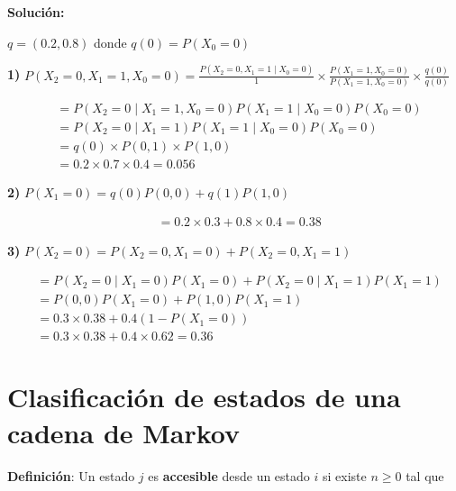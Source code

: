 \documentclass[12pt,a4paper]{article}
\begin{document}
\textbf{Solución:}

$q = (0.2, 0.8)$ donde $q(0) = P(X_0 = 0)$

\begin{center}
\end{center}

\textbf{1)} $P(X_2 = 0, X_1 = 1, X_0 = 0) = \frac{P(X_2 = 0, X_1 = 1 \mid X_0 = 0)}{1} \times \frac{P(X_1 = 1, X_0 = 0)}{P(X_1 = 1, X_0 = 0)} \times \frac{q(0)}{q(0)}$

\begin{align*}
&= P(X_2 = 0 \mid X_1 = 1, X_0 = 0) P(X_1 = 1 \mid X_0 = 0) P(X_0 = 0) \\
&= P(X_2 = 0 \mid X_1 = 1) P(X_1 = 1 \mid X_0 = 0) P(X_0 = 0) \\
&= q(0) \times P(0,1) \times P(1,0) \\
&= 0.2 \times 0.7 \times 0.4 = 0.056
\end{align*}

\textbf{2)} $P(X_1 = 0) = q(0) P(0,0) + q(1) P(1,0)$

\begin{align*}
&= 0.2 \times 0.3 + 0.8 \times 0.4 = 0.38
\end{align*}

\textbf{3)} $P(X_2 = 0) = P(X_2 = 0, X_1 = 0) + P(X_2 = 0, X_1 = 1)$

\begin{align*}
&= P(X_2 = 0 \mid X_1 = 0) P(X_1 = 0) + P(X_2 = 0 \mid X_1 = 1) P(X_1 = 1) \\
&= P(0,0) P(X_1 = 0) + P(1,0) P(X_1 = 1) \\
&= 0.3 \times 0.38 + 0.4 (1 - P(X_1 = 0)) \\
&= 0.3 \times 0.38 + 0.4 \times 0.62 = 0.36
\end{align*}

\section*{Clasificación de estados de una cadena de Markov}

\textbf{Definición}: Un estado $j$ es \textbf{accesible} desde un estado $i$ si existe $n \geq 0$ tal que
\end{document}
